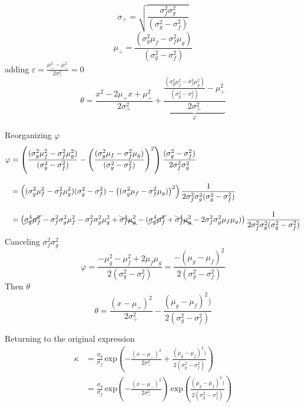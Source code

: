 \documentclass[article]{jss}
\begin{document}
%
\begin{equation}
 \sigma_{\div} = \sqrt{\frac{\sigma_f^2\sigma_g^2}{(\sigma_g^2 - \sigma_f^2)}}
\end{equation}
%
\begin{equation}
 \mu_{\div} = \frac{(\sigma_g^2\mu_f - \sigma_f^2\mu_g)}{(\sigma_g^2 - \sigma_f^2)}
\end{equation}
%
adding $\varepsilon = \frac{\mu_{\div}^2-\mu_{\div}^2}{2\sigma_{\div}^2} = 0$
\begin{equation}
\theta = \frac{x^2 - 2\mu_{\div}x + \mu_{\div}^2 }{2\sigma_{\div}^2} + \underbrace{ \frac{ \frac{(\sigma_g^2\mu_f^2 - \sigma_f^2\mu_g^2)}{(\sigma_g^2 - \sigma_f^2)} - \mu_{\div}^2 }{2\sigma_{\div}^2} }_{\varphi}
\end{equation}

Reorganizing $\varphi$
\begin{equation}
\begin{split}
 \varphi & = \left( \frac{(\sigma_g^2\mu_f^2 - \sigma_f^2\mu_g^2)}{(\sigma_g^2 - \sigma_f^2)} - \left(\frac{(\sigma_g^2\mu_f - \sigma_f^2\mu_g)}{(\sigma_g^2 - \sigma_f^2)} \right)^2 \right) \frac{(\sigma_g^2 - \sigma_f^2)}{2\sigma_f^2\sigma_g^2} \\[0.3cm]
 & = \left((\sigma_g^2\mu_f^2 - \sigma_f^2\mu_g^2)(\sigma_g^2 - \sigma_f^2) - \left((\sigma_g^2\mu_f - \sigma_f^2\mu_g) \right)^2 \right) \frac{1}{2\sigma_f^2\sigma_g^2(\sigma_g^2 - \sigma_f^2)} \\[0.3cm]
 & =  \left( \cancel{\sigma_g^4\mu_f^2} - \sigma_f^2\sigma_g^2\mu_f^2 - \sigma_f^2\sigma_g^2\mu_g^2 + \bcancel{\sigma_f^4\mu_g^2} - (\cancel{\sigma_g^4\mu_f^2} + \bcancel{\sigma_f^4\mu_g^2 } - 2\sigma_f^2\sigma_g^2\mu_f\mu_g)\right) \frac{1}{2\sigma_f^2\sigma_g^2(\sigma_g^2 - \sigma_f^2)}
 \end{split}
\end{equation}
%
Canceling $\sigma_f^2\sigma_g^2$
\begin{equation}
 \varphi = \frac{- \mu_g^2 - \mu_f^2 + 2\mu_f\mu_g}{2(\sigma_g^2 - \sigma_f^2)} = \frac{- (\mu_g - \mu_f)^2}{2(\sigma_g^2 - \sigma_f^2)}
\end{equation}
%
Then $\theta$
\begin{equation}
 \theta = \frac{(x - \mu_{\div})^2}{2\sigma_{\div}^2} - \frac{(\mu_g - \mu_f)^2)}{2(\sigma_g^2 - \sigma_f^2)}
\end{equation}

Returning to the original expression
\begin{equation}
\begin{split}
 \kappa & = \frac{\sigma_g}{\sigma_f}  \, \text{exp}\left(- \frac{(x - \mu_{\div})^2}{2\sigma_{\div}^2} + \frac{(\mu_g - \mu_f)^2)}{2(\sigma_g^2 - \sigma_f^2)}  \right)\\[0.3cm]
 & = \frac{\sigma_g}{\sigma_f} \, \text{exp}\left({-\frac{(x - \mu_{\div})^2}{2\sigma_{\div}^2}}\right) \, \text{exp}\left({\frac{(\mu_g - \mu_f)^2)}{2(\sigma_g^2 - \sigma_f^2)}}\right)
\end{split}
\end{equation}
\end{document}
